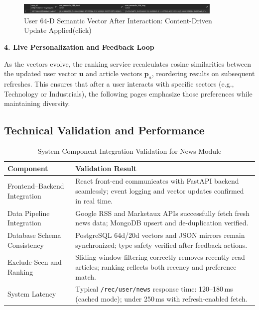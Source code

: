 \begin{figure}[H]
  \centering
  \includegraphics[width=0.88\textwidth]{images/news/64d2.png}
  \caption{User 64-D Semantic Vector After Interaction: Content-Driven Update Applied(click)}
  \label{fig:64d2}
\end{figure}

\textbf{4. Live Personalization and Feedback Loop}

As the vectors evolve, the ranking service recalculates cosine similarities between the updated user vector \(\mathbf{u}\) and article vectors \(\mathbf{p}_a\), reordering results on subsequent refreshes. This ensures that after a user interacts with specific sectors (e.g., Technology or Industrials), the following pages emphasize those preferences while maintaining diversity.

\subsection{Technical Validation and Performance}

\begin{table}[H]
\centering
\caption{System Component Integration Validation for News Module}
\label{tab:news_validation}
\begin{tabularx}{\textwidth}{@{}p{5cm} X@{}}
\toprule
\textbf{Component} & \textbf{Validation Result} \\
\midrule
Frontend--Backend Integration & React front-end communicates with FastAPI backend seamlessly; event logging and vector updates confirmed in real time. \\
Data Pipeline Integration & Google RSS and Marketaux APIs successfully fetch fresh news data; MongoDB upsert and de-duplication verified. \\
Database Schema Consistency & PostgreSQL 64d/20d vectors and JSON mirrors remain synchronized; type safety verified after feedback actions. \\
Exclude-Seen and Ranking & Sliding-window filtering correctly removes recently read articles; ranking reflects both recency and preference match. \\
System Latency & Typical \texttt{/rec/user/news} response time: 120--180\,ms (cached mode); under 250\,ms with refresh-enabled fetch. \\
\bottomrule
\end{tabularx}
\end{table}

